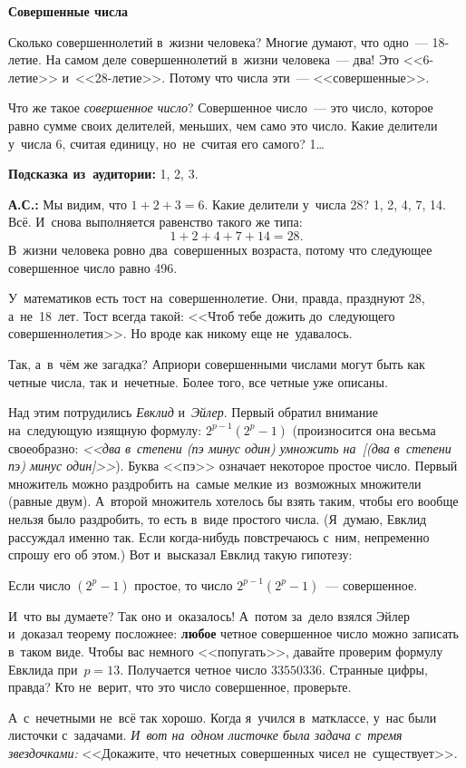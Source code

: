 \textbf{Совершенные числа}

Сколько совершеннолетий в~жизни человека? Многие думают, что одно~--- 18-летие. На самом деле совершеннолетий в~жизни человека~--- два!
Это <<6-летие>> и~<<28-летие>>. Потому что числа эти~--- <<совершенные>>.

Что же такое \textit{совершенное число}? Совершенное число~--- это число, которое равно сумме своих
делителей, меньших, чем само это число. Какие делители у~числа 6, считая единицу, но~не~считая его
самого? 1\ldots

\textbf{Подсказка из~аудитории:} 1, 2, 3.

\textbf{А.С.:} Мы видим, что $1+2+3 = 6$.
Какие делители у~числа 28?
1, 2, 4, 7, 14. Всё. И~снова выполняется равенство такого же типа:
$$
1+2+4+7+14 = 28.
$$
В~жизни человека ровно два~совершенных возраста, потому что следующее совершенное число равно 496.

У~математиков есть тост на~совершеннолетие. Они, правда, празднуют 28, а~не~18~лет. Тост всегда
такой: <<Чтоб тебе дожить до~следующего совершеннолетия>>. Но вроде как никому еще не~удавалось.

Так, а~в~чём же загадка? Априори совершенными числами могут быть как четные числа, так и~нечетные.
Более того, все четные уже описаны.

Над этим потрудились \textit{Евклид} и~\textit{Эйлер}. Первый обратил внимание на~следующую изящную
формулу: $2^{p-1}(2^{p}-1)$ (произносится она весьма своеобразно: \textit{<<два в~степени (пэ минус
один) умножить на~[(два в~степени пэ) минус один]>>}).
Буква <<пэ>> означает некоторое простое число.
Первый множитель можно раздробить на~самые мелкие из~возможных множители (равные двум). А~второй
множитель хотелось бы взять таким, чтобы его вообще нельзя было раздробить, то есть в~виде простого
числа. (Я~думаю, Евклид рассуждал именно так. Если когда-нибудь повстречаюсь с~ним, непременно
спрошу его об этом.) Вот и~высказал Евклид такую гипотезу:

Если число $(2^{p}-1)$ простое, то число $2^{p-1}(2^{p}-1)$~--- совершенное.

И~что вы думаете? Так оно и~оказалось! А~потом за~дело взялся Эйлер и~доказал теорему посложнее:
\textbf{любое} четное совершенное число можно записать в~таком виде. Чтобы вас немного <<попугать>>, давайте
проверим формулу Евклида при~$p=13$. Получается четное число
$
33550336.
$
Странные цифры, правда? Кто не~верит, что это число совершенное, проверьте.

А~с~нечетными не~всё так хорошо. Когда я~учился в~матклассе, у~нас были листочки с~задачами. \textit{И~вот
на~одном листочке была задача с~тремя звездочками:} <<Докажите, что нечетных совершенных чисел
не~существует>>.

